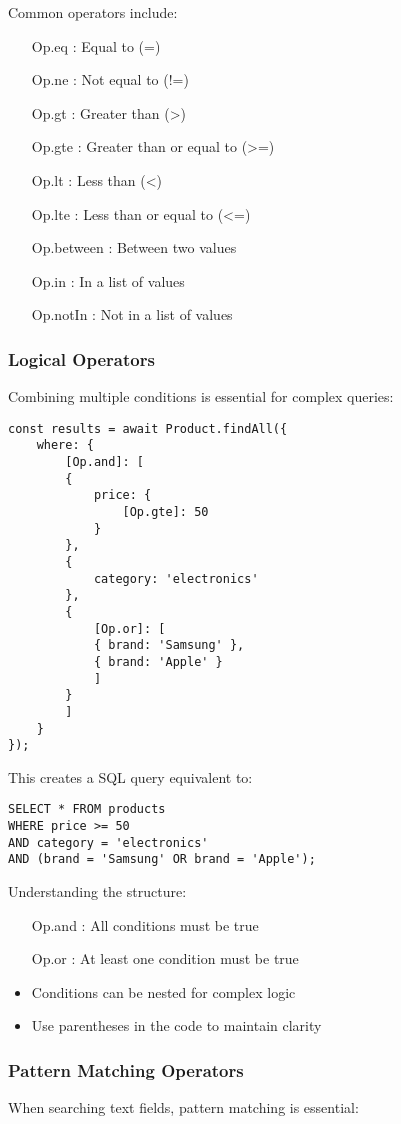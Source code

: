 \documentclass[12pt,a4paper]{book}
\begin{document}
		Common operators include:
		\begin{itemize}
			\item [Op.eq]: Equal to (=)
			\item [Op.ne]: Not equal to (!=)
			\item [Op.gt]: Greater than (>)
			\item [Op.gte]: Greater than or equal to (>=)
			\item [Op.lt]: Less than (<)
			\item [Op.lte]: Less than or equal to (<=)
			\item [Op.between]: Between two values
			\item [Op.in]: In a list of values
			\item [Op.notIn]: Not in a list of values
		\end{itemize}
	
	
	\subsubsection{Logical Operators}
	Combining multiple conditions is essential for complex queries:
	
	
		\begin{verbatim}
const results = await Product.findAll({
	where: {
		[Op.and]: [
		{
			price: {
				[Op.gte]: 50
			}
		},
		{
			category: 'electronics'
		},
		{
			[Op.or]: [
			{ brand: 'Samsung' },
			{ brand: 'Apple' }
			]
		}
		]
	}
});
		\end{verbatim}
		
		This creates a SQL query equivalent to:
		\begin{verbatim}
SELECT * FROM products 
WHERE price >= 50 
AND category = 'electronics'
AND (brand = 'Samsung' OR brand = 'Apple');
		\end{verbatim}
		
		Understanding the structure:
		\begin{itemize}
			\item [Op.and]: All conditions must be true
			\item [Op.or]: At least one condition must be true
			\item Conditions can be nested for complex logic
			\item Use parentheses in the code to maintain clarity
		\end{itemize}
	
	\subsubsection{Pattern Matching Operators}
	When searching text fields, pattern matching is essential:
	
\end{document}
